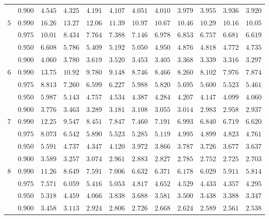 \documentclass[11pt]{article}
\theoremstyle{definition}
\begin{document}
\begin{table}[H]
\begin{tabularx}{\linewidth}{c | c | c c c c c c c c c c}
		& $0.900$ & $4.545$ & $4.325$ & $4.191$ & $4.107$ & $4.051$ & $4.010$ & $3.979$ & $3.955$ & $3.936$ & $3.920$ \\
		$5$ & $0.990$ & $16.26$ & $13.27$ & $12.06$ & $11.39$ & $10.97$ & $10.67$ & $10.46$ & $10.29$ & $10.16$ & $10.05$ \\
		& $0.975$ & $10.01$ & $8.434$ & $7.764$ & $7.388$ & $7.146$ & $6.978$ & $6.853$ & $6.757$ & $6.681$ & $6.619$ \\
		& $0.950$ & $6.608$ & $5.786$ & $5.409$ & $5.192$ & $5.050$ & $4.950$ & $4.876$ & $4.818$ & $4.772$ & $4.735$ \\
		& $0.900$ & $4.060$ & $3.780$ & $3.619$ & $3.520$ & $3.453$ & $3.405$ & $3.368$ & $3.339$ & $3.316$ & $3.297$ \\
		$6$ & $0.990$ & $13.75$ & $10.92$ & $9.780$ & $9.148$ & $8.746$ & $8.466$ & $8.260$ & $8.102$ & $7.976$ & $7.874$ \\
		& $0.975$ & $8.813$ & $7.260$ & $6.599$ & $6.227$ & $5.988$ & $5.820$ & $5.695$ & $5.600$ & $5.523$ & $5.461$ \\
		& $0.950$ & $5.987$ & $5.143$ & $4.757$ & $4.534$ & $4.387$ & $4.284$ & $4.207$ & $4.147$ & $4.099$ & $4.060$ \\
		& $0.900$ & $3.776$ & $3.463$ & $3.289$ & $3.181$ & $3.108$ & $3.055$ & $3.014$ & $2.983$ & $2.958$ & $2.937$ \\
		$7$ & $0.990$ & $12.25$ & $9.547$ & $8.451$ & $7.847$ & $7.460$ & $7.191$ & $6.993$ & $6.840$ & $6.719$ & $6.620$ \\
		& $0.975$ & $8.073$ & $6.542$ & $5.890$ & $5.523$ & $5.285$ & $5.119$ & $4.995$ & $4.899$ & $4.823$ & $4.761$ \\
		& $0.950$ & $5.591$ & $4.737$ & $4.347$ & $4.120$ & $3.972$ & $3.866$ & $3.787$ & $3.726$ & $3.677$ & $3.637$ \\
		& $0.900$ & $3.589$ & $3.257$ & $3.074$ & $2.961$ & $2.883$ & $2.827$ & $2.785$ & $2.752$ & $2.725$ & $2.703$ \\
		$8$ & $0.990$ & $11.26$ & $8.649$ & $7.591$ & $7.006$ & $6.632$ & $6.371$ & $6.178$ & $6.029$ & $5.911$ & $5.814$ \\
		& $0.975$ & $7.571$ & $6.059$ & $5.416$ & $5.053$ & $4.817$ & $4.652$ & $4.529$ & $4.433$ & $4.357$ & $4.295$ \\
		& $0.950$ & $5.318$ & $4.459$ & $4.066$ & $3.838$ & $3.688$ & $3.581$ & $3.500$ & $3.438$ & $3.388$ & $3.347$ \\
		& $0.900$ & $3.458$ & $3.113$ & $2.924$ & $2.806$ & $2.726$ & $2.668$ & $2.624$ & $2.589$ & $2.561$ & $2.538$ \\

\end{tabularx}
\end{table}
\end{document}
